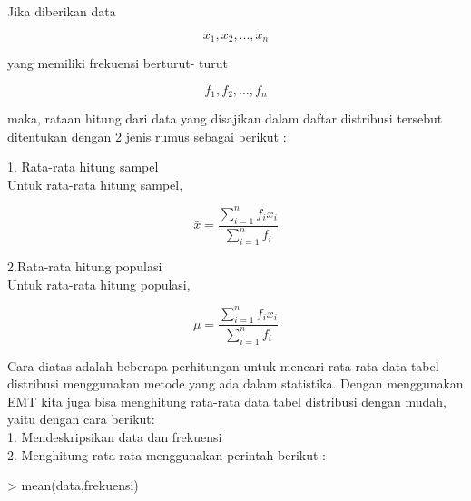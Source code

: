 \documentclass[a4paper,10pt]{article}
\begin{document}
\begin{eulernotebook}
\begin{eulercomment}
\begin{eulercomment}
\begin{eulercomment}
\begin{eulercomment}
\begin{eulercomment}
\begin{eulercomment}
\begin{eulercomment}
\begin{eulercomment}
\begin{eulercomment}
\begin{eulercomment}
\begin{eulercomment}
\end{eulercomment}
\begin{eulercomment}
Jika diberikan data\\
\end{eulercomment}
\begin{eulerformula}
\[
x_1,x_2,...,x_n
\]
\end{eulerformula}
\begin{eulercomment}
yang memiliki frekuensi berturut- turut\\
\end{eulercomment}
\begin{eulerformula}
\[
f_1,f_2,...,f_n
\]
\end{eulerformula}
\begin{eulercomment}
maka, rataan hitung dari data yang disajikan dalam daftar distribusi
tersebut ditentukan dengan 2 jenis rumus sebagai berikut :

1. Rata-rata hitung sampel\\
Untuk rata-rata hitung sampel,\\
\end{eulercomment}
\begin{eulerformula}
\[
\bar{x}=\frac{\sum_{i=1}^{n} f_i x_i}{\sum_{i=1}^{n} f_i}
\]
\end{eulerformula}
\begin{eulercomment}
2.Rata-rata hitung populasi\\
Untuk rata-rata hitung populasi,\\
\end{eulercomment}
\begin{eulerformula}
\[
\mu=\frac{\sum_{i=1}^{n} f_i x_i}{\sum_{i=1}^{n} f_i}
\]
\end{eulerformula}
\begin{eulercomment}
Cara diatas adalah beberapa perhitungan untuk mencari rata-rata data
tabel distribusi menggunakan metode yang ada dalam statistika. Dengan
menggunakan EMT kita juga bisa menghitung rata-rata data tabel
distribusi dengan mudah, yaitu dengan cara berikut:\\
1. Mendeskripsikan data dan frekuensi\\
2. Menghitung rata-rata menggunakan perintah berikut :

\textgreater{} mean(data,frekuensi)


\end{eulercomment}
\end{eulercomment}
\end{eulercomment}
\end{eulercomment}
\end{eulercomment}
\end{eulercomment}
\end{eulercomment}
\end{eulercomment}
\end{eulercomment}
\end{eulercomment}
\end{eulercomment}
\end{eulernotebook}
\end{document}
